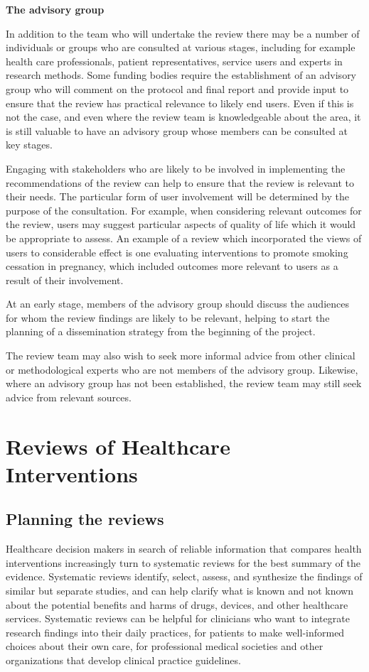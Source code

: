 \documentclass[
  11pt,
  a4paper,
  DIV=11,
  numbers=noendperiod]{scrreprt}
\begin{document}
\textbf{The advisory group}

In addition to the team who will undertake the review there may be a
number of individuals or groups who are consulted at various stages,
including for example health care professionals, patient
representatives, service users and experts in research methods. Some
funding bodies require the establishment of an advisory group who will
comment on the protocol and final report and provide input to ensure
that the review has practical relevance to likely end users. Even if
this is not the case, and even where the review team is knowledgeable
about the area, it is still valuable to have an advisory group whose
members can be consulted at key stages.

Engaging with stakeholders who are likely to be involved in implementing
the recommendations of the review can help to ensure that the review is
relevant to their needs. The particular form of user involvement will be
determined by the purpose of the consultation. For example, when
considering relevant outcomes for the review, users may suggest
particular aspects of quality of life which it would be appropriate to
assess. An example of a review which incorporated the views of users to
considerable effect is one evaluating interventions to promote smoking
cessation in pregnancy, which included outcomes more relevant to users
as a result of their involvement.

At an early stage, members of the advisory group should discuss the
audiences for whom the review findings are likely to be relevant,
helping to start the planning of a dissemination strategy from the
beginning of the project.

The review team may also wish to seek more informal advice from other
clinical or methodological experts who are not members of the advisory
group. Likewise, where an advisory group has not been established, the
review team may still seek advice from relevant sources.

\part{Reviews of Healthcare Interventions}

\chapter{Planning the
reviews}\label{sec-planning-systematic-reviews-of-interventions}

Healthcare decision makers in search of reliable information that
compares health interventions increasingly turn to systematic reviews
for the best summary of the evidence. Systematic reviews identify,
select, assess, and synthesize the findings of similar but separate
studies, and can help clarify what is known and not known about the
potential benefits and harms of drugs, devices, and other healthcare
services. Systematic reviews can be helpful for clinicians who want to
integrate research findings into their daily practices, for patients to
make well-informed choices about their own care, for professional
medical societies and other organizations that develop clinical practice
guidelines.
\end{document}
